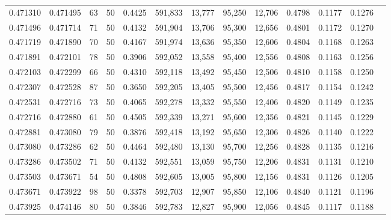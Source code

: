 \begin{tabular}{rrrrrrrrrrrrr}
0.471310 & 0.471495 &    63 &  50 &                                     0.4425 & 591,833 &  13,777 &  95,250 &  12,706 & 0.4798 & 0.1177 & 0.1276 \\
0.471496 & 0.471714 &    71 &  50 &                                     0.4132 & 591,904 &  13,706 &  95,300 &  12,656 & 0.4801 & 0.1172 & 0.1270 \\
0.471719 & 0.471890 &    70 &  50 &                                     0.4167 & 591,974 &  13,636 &  95,350 &  12,606 & 0.4804 & 0.1168 & 0.1263 \\
0.471891 & 0.472101 &    78 &  50 &                                     0.3906 & 592,052 &  13,558 &  95,400 &  12,556 & 0.4808 & 0.1163 & 0.1256 \\
0.472103 & 0.472299 &    66 &  50 &                                     0.4310 & 592,118 &  13,492 &  95,450 &  12,506 & 0.4810 & 0.1158 & 0.1250 \\
0.472307 & 0.472528 &    87 &  50 &                                     0.3650 & 592,205 &  13,405 &  95,500 &  12,456 & 0.4817 & 0.1154 & 0.1242 \\
0.472531 & 0.472716 &    73 &  50 &                                     0.4065 & 592,278 &  13,332 &  95,550 &  12,406 & 0.4820 & 0.1149 & 0.1235 \\
0.472716 & 0.472880 &    61 &  50 &                                     0.4505 & 592,339 &  13,271 &  95,600 &  12,356 & 0.4821 & 0.1145 & 0.1229 \\
0.472881 & 0.473080 &    79 &  50 &                                     0.3876 & 592,418 &  13,192 &  95,650 &  12,306 & 0.4826 & 0.1140 & 0.1222 \\
0.473080 & 0.473286 &    62 &  50 &                                     0.4464 & 592,480 &  13,130 &  95,700 &  12,256 & 0.4828 & 0.1135 & 0.1216 \\
0.473286 & 0.473502 &    71 &  50 &                                     0.4132 & 592,551 &  13,059 &  95,750 &  12,206 & 0.4831 & 0.1131 & 0.1210 \\
0.473503 & 0.473671 &    54 &  50 &                                     0.4808 & 592,605 &  13,005 &  95,800 &  12,156 & 0.4831 & 0.1126 & 0.1205 \\
0.473671 & 0.473922 &    98 &  50 &                                     0.3378 & 592,703 &  12,907 &  95,850 &  12,106 & 0.4840 & 0.1121 & 0.1196 \\
0.473925 & 0.474146 &    80 &  50 &                                     0.3846 & 592,783 &  12,827 &  95,900 &  12,056 & 0.4845 & 0.1117 & 0.1188 \\

\end{tabular}
